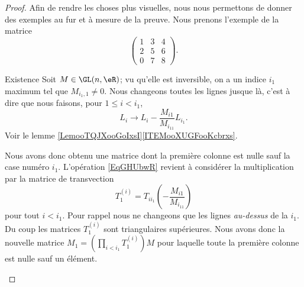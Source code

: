 \begin{proof}
    Afin de rendre les choses plus visuelles, nous nous permettons de donner des exemples au fur et à mesure de la preuve. Nous prenons l'exemple de la matrice
    \begin{equation}
        \begin{pmatrix}
            1    &   3    &   4    \\
            2    &   5    &   6    \\
            0    &   7    &   8
        \end{pmatrix}.
    \end{equation}
    \begin{subproof}
    \item[Existence]
        Soit \( M\in \GL(n,\eR)\); vu qu'elle est inversible, on a un indice \( i_1\) maximum tel que \( M_{i_1,1}\neq 0\). Nous changeons toutes les lignes jusque là, c'est à dire que nous faisons, pour \( 1\leq i< i_1\),
        \begin{equation}        \label{EqGHUbwR}
            L_i\to L_i-\frac{ M_{i1} }{ M_{i_11} }L_{i_1}.
        \end{equation}
        Voir le lemme \ref{LemooTQJXooGoIxsI}\ref{ITEMooXUGFooKcbrxs}.

        Nous avons donc obtenu une matrice dont la première colonne est nulle sauf la case numéro \( i_1\). L'opération \eqref{EqGHUbwR} revient à considérer la multiplication par la matrice de transvection
        \begin{equation}
            T_1^{(i)}=T_{ii_1}\left( -\frac{ M_{i1} }{ M_{i_11} } \right)
        \end{equation}
        pour tout \( i<i_1\). Pour rappel nous ne changeons que les lignes \emph{au-dessus} de la \( i_1\). Du coup les matrices \( T^{(i)}_1\) sont triangulaires supérieures. Nous avons donc la nouvelle matrice \( M_1=\left( \prod_{i<i_1}T_1^{(i)} \right)M\) pour laquelle toute la première colonne est nulle sauf un élément.


\end{subproof}
\end{proof}
